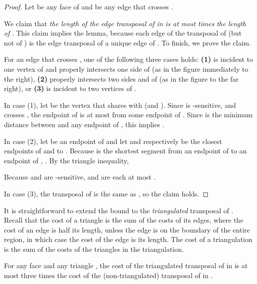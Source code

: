 \documentclass[final]{siamltex}
\newcommand{\Picture}[1]{}
\newcommand{\xfigpdf}[1]{\Picture{#1.pdf_t}}
\newcommand{\xfig}[1]{\xfigpdf{#1}}
\begin{document}
\begin{proof}  Let  be any face of  and  be any edge that crosses . 

    We claim that {\em the length of the edge transposal 
      of  in  is at most  times the length of }.
    This claim implies the lemma,
    because each edge of the transposal of  (but not of )
    is the edge transposal 
    of a unique edge  of .
    To finish, we prove the claim.
  \begin{window}[0,r,{\scalebox{.5}{\xfig{transposal-length}}},{}]
    For an edge  that crosses , one of the following three cases holds:
    {\bf (1)}  is incident to one vertex of  and properly intersects one  side of 
    (as in the figure immediately to the right),
    {\bf (2)}  properly intersects two sides  and  of 
    (as in the figure to the far right),
    or
    {\bf (3)}  is incident to two vertices of .


\hspace*{\parindent}In case (1), let  be the vertex that  shares with  (and ).
 Since  is -sensitive, and  crosses ,
 the endpoint  of  is at most  
 from some endpoint of .
 Since  is the minimum distance
 between  and any endpoint of , this implies
 .

 \end{window}


 In case (2), let  be an endpoint of  and let  and  respectively be 
 the closest endpoints of  and  to .
 Because  is the shortest segment 
 from an endpoint of  to an endpoint of ,
 .
 By the triangle inequality,
 
 Because  and  are -sensitive,
  and  are each at most .

 In case (3), the transposal  of  is the same as , 
 so  the claim holds.
\end{proof}

It is straightforward to extend the bound to the {\em triangulated} transposal 
 of .
Recall that the cost of a triangle  is the sum of the costs of its edges,
where the cost of an edge is half its length, unless the edge is on the boundary
of the entire region, in which case the cost of the edge is its length.
The cost 
of a triangulation 
is the sum of the costs of the triangles 
in the triangulation.

\begin{lemma}\label{lemma:6-gon}
  For any face  and any triangle , 
  the cost 
  of the triangulated transposal of  in 
  is at most three times the cost  
  of the (non-triangulated) transposal of  in .
\end{lemma}
\end{document}
